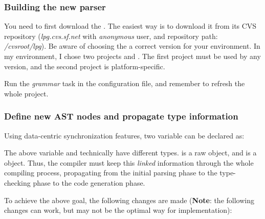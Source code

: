 \documentclass{article}
\begin{document}
\subsubsection{Building the new parser}

You need to first download the . The easiest way is to download it from its CVS repository (\textit{lpg.cvs.sf.net} with \textit{anonymous} user, and repository path: \textit{/cvsroot/lpg}).
Be aware of choosing the a correct version for your environment. In my environment, I chose two projects  and . The first project must be used by any version, and the second project is platform-specific.

Run the \textit{grammar} task in the  configuration file, and remember to refresh the whole project.

\subsubsection{Define new AST nodes and propagate type information}


Using data-centric synchronization features, two variable can be declared as:



The above variable  and   technically have different types.  is a raw  object, and  is a  object. Thus,  the compiler must
keep this \textit{linked} information through the whole compiling process,  propagating from the initial parsing phase to the  type-checking phase to the code generation phase.

To achieve the above goal, the following changes are made  (\textbf{Note}: the following changes can work,  but may not be the optimal way for implementation):
\end{document}
